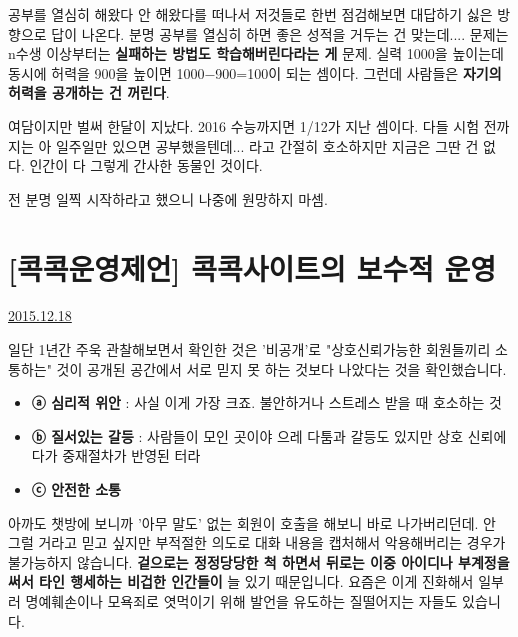 공부를 열심히 해왔다 안 해왔다를 떠나서 저것들로 한번 점검해보면 대답하기 싫은 방향으로 답이 나온다.
분명 공부를 열심히 하면 좋은 성적을 거두는 건 맞는데.... 문제는 n수생 이상부터는 \textbf{실패하는 방법도 학습해버린다라는 게} 문제.
실력 1000을 높이는데 동시에 허력을 900을 높이면 1000$-$900=100이 되는 셈이다.
그런데 사람들은 \textbf{자기의 허력을 공개하는 건 꺼린다}.
\vspace{5mm}

여담이지만 벌써 한달이 지났다. 2016 수능까지면 1/12가 지난 셈이다.
다들 시험 전까지는 아 일주일만 있으면 공부했을텐데... 라고 간절히 호소하지만 지금은 그딴 건 없다.
인간이 다 그렇게 간사한 동물인 것이다.
\vspace{5mm}

전 분명 일찍 시작하라고 했으니 나중에 원망하지 마셈.
\vspace{5mm}







\section{[콕콕운영제언] 콕콕사이트의 보수적 운영}
\href{https://www.kockoc.com/Apoc/552129}{2015.12.18}

\vspace{5mm}

일단 1년간 주욱 관찰해보면서 확인한 것은
'비공개'로 "상호신뢰가능한 회원들끼리 소통하는" 것이
공개된 공간에서 서로 믿지 못 하는 것보다 나았다는 것을 확인했습니다.
\vspace{5mm}

\begin{itemize}
    \item[] \textbf{ⓐ 심리적 위안} : 사실 이게 가장 크죠. 불안하거나 스트레스 받을 때 호소하는 것
    \item[] \textbf{ⓑ 질서있는 갈등} : 사람들이 모인 곳이야 으레 다툼과 갈등도 있지만 상호 신뢰에다가 중재절차가 반영된 터라
    \vspace{5mm}
    
    \item[] \textbf{ⓒ 안전한 소통}
    \vspace{5mm}
\end{itemize}

아까도 챗방에 보니까 '아무 말도' 없는 회원이 호출을 해보니 바로 나가버리던데.
안 그럴 거라고 믿고 싶지만 부적절한 의도로 대화 내용을 캡처해서 악용해버리는 경우가 불가능하지 않습니다.
\textbf{겉으로는 정정당당한 척 하면서 뒤로는 이중 아이디나 부계정을 써서 타인 행세하는 비겁한 인간들이} 늘 있기 때문입니다.
요즘은 이게 진화해서 일부러 명예훼손이나 모욕죄로 엿먹이기 위해 발언을 유도하는 질떨어지는 자들도 있습니다.
\vspace{5mm}

